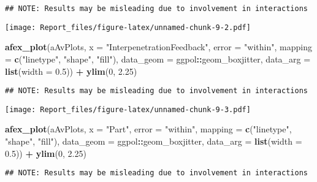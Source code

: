 \documentclass[
]{article}
\newenvironment{Shaded}{\begin{snugshade}}{\end{snugshade}}
\newcommand{\DataTypeTok}[1]{\textcolor[rgb]{0.13,0.29,0.53}{#1}}
\newcommand{\DecValTok}[1]{\textcolor[rgb]{0.00,0.00,0.81}{#1}}
\newcommand{\FloatTok}[1]{\textcolor[rgb]{0.00,0.00,0.81}{#1}}
\newcommand{\KeywordTok}[1]{\textcolor[rgb]{0.13,0.29,0.53}{\textbf{#1}}}
\newcommand{\NormalTok}[1]{#1}
\newcommand{\OperatorTok}[1]{\textcolor[rgb]{0.81,0.36,0.00}{\textbf{#1}}}
\newcommand{\StringTok}[1]{\textcolor[rgb]{0.31,0.60,0.02}{#1}}
\begin{document}
\begin{verbatim}
## NOTE: Results may be misleading due to involvement in interactions
\end{verbatim}

\texttt{[image: Report\_files/figure-latex/unnamed-chunk-9-2.pdf]}

\begin{Shaded}
\begin{Highlighting}[]
\KeywordTok{afex_plot}\NormalTok{(aAvPlots, }\DataTypeTok{x =} \StringTok{"InterpenetrationFeedback"}\NormalTok{, }\DataTypeTok{error =} \StringTok{"within"}\NormalTok{, }
                \DataTypeTok{mapping =} \KeywordTok{c}\NormalTok{(}\StringTok{"linetype"}\NormalTok{, }\StringTok{"shape"}\NormalTok{, }\StringTok{"fill"}\NormalTok{),}
                \DataTypeTok{data_geom =}\NormalTok{ ggpol}\OperatorTok{::}\NormalTok{geom_boxjitter, }
                \DataTypeTok{data_arg =} \KeywordTok{list}\NormalTok{(}\DataTypeTok{width =} \FloatTok{0.5}\NormalTok{)) }\OperatorTok{+}
\StringTok{            }\KeywordTok{ylim}\NormalTok{(}\DecValTok{0}\NormalTok{, }\FloatTok{2.25}\NormalTok{)}
\end{Highlighting}
\end{Shaded}

\begin{verbatim}
## NOTE: Results may be misleading due to involvement in interactions
\end{verbatim}

\texttt{[image: Report\_files/figure-latex/unnamed-chunk-9-3.pdf]}

\begin{Shaded}
\begin{Highlighting}[]
\KeywordTok{afex_plot}\NormalTok{(aAvPlots, }\DataTypeTok{x =} \StringTok{"Part"}\NormalTok{, }\DataTypeTok{error =} \StringTok{"within"}\NormalTok{, }
                \DataTypeTok{mapping =} \KeywordTok{c}\NormalTok{(}\StringTok{"linetype"}\NormalTok{, }\StringTok{"shape"}\NormalTok{, }\StringTok{"fill"}\NormalTok{),}
                \DataTypeTok{data_geom =}\NormalTok{ ggpol}\OperatorTok{::}\NormalTok{geom_boxjitter, }
                \DataTypeTok{data_arg =} \KeywordTok{list}\NormalTok{(}\DataTypeTok{width =} \FloatTok{0.5}\NormalTok{))  }\OperatorTok{+}
\StringTok{            }\KeywordTok{ylim}\NormalTok{(}\DecValTok{0}\NormalTok{, }\FloatTok{2.25}\NormalTok{)}
\end{Highlighting}
\end{Shaded}

\begin{verbatim}
## NOTE: Results may be misleading due to involvement in interactions
\end{verbatim}
\end{document}
